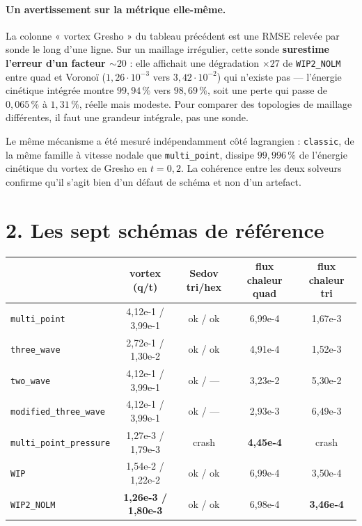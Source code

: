 \documentclass[11pt,a4paper]{article}
\begin{document}
\paragraph{Un avertissement sur la métrique elle-même.} La colonne « vortex
Gresho » du tableau précédent est une RMSE relevée par sonde le long d'une
ligne. Sur un maillage irrégulier, cette sonde \textbf{surestime l'erreur d'un
facteur $\sim20$} : elle affichait une dégradation $\times27$ de
\texttt{WIP2\_NOLM} entre quad et Voronoï ($1{,}26\cdot10^{-3}$ vers
$3{,}42\cdot10^{-2}$) qui n'existe pas --- l'énergie cinétique intégrée montre
$99{,}94\,\%$ vers $98{,}69\,\%$, soit une perte qui passe de $0{,}065\,\%$ à
$1{,}31\,\%$, réelle mais modeste. Pour comparer des topologies de maillage
différentes, il faut une grandeur intégrale, pas une sonde.

Le même mécanisme a été mesuré indépendamment côté lagrangien : \texttt{classic},
de la même famille à vitesse nodale que \texttt{multi\_point}, dissipe $99{,}996\,\%$
de l'énergie cinétique du vortex de Gresho en $t=0{,}2$. La cohérence entre les deux
solveurs confirme qu'il s'agit bien d'un défaut de schéma et non d'un artefact.

\section*{2. Les sept schémas de référence}

\begin{table}[h]\centering
\begin{tabular}{lcccc}
\toprule
& vortex (q/t) & Sedov tri/hex & flux chaleur quad & flux chaleur tri \\
\midrule
\texttt{multi\_point}          & 4{,}12e-1 / 3{,}99e-1 & ok / ok & 6{,}99e-4 & 1{,}67e-3 \\
\texttt{three\_wave}           & 2{,}72e-1 / 1{,}30e-2 & ok / ok & 4{,}91e-4 & 1{,}52e-3 \\
\texttt{two\_wave}             & 4{,}12e-1 / 3{,}99e-1 & ok / --- & 3{,}23e-2 & 5{,}30e-2 \\
\texttt{modified\_three\_wave} & 4{,}12e-1 / 3{,}99e-1 & ok / --- & 2{,}93e-3 & 6{,}49e-3 \\
\texttt{multi\_point\_pressure}& 1{,}27e-3 / 1{,}79e-3 & \textcolor{BrickRed}{crash} & \textbf{4{,}45e-4} & \textcolor{BrickRed}{crash} \\
\texttt{WIP}                   & 1{,}54e-2 / 1{,}22e-2 & ok / ok & 6{,}99e-4 & 3{,}50e-4 \\
\texttt{WIP2\_NOLM}            & \textbf{1{,}26e-3 / 1{,}80e-3} & ok / ok & 6{,}98e-4 & \textbf{3{,}46e-4} \\
\bottomrule
\end{tabular}
\end{table}
\end{document}
